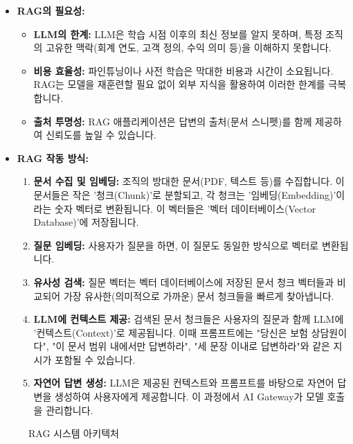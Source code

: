 \documentclass[11pt,a4paper]{article}
\theoremstyle{definition}
\begin{document}
\begin{itemize}
    \item \textbf{RAG의 필요성:}
    \begin{itemize}
        \item \textbf{LLM의 한계:} LLM은 학습 시점 이후의 최신 정보를 알지 못하며, 특정 조직의 고유한 맥락(회계 연도, 고객 정의, 수익 의미 등)을 이해하지 못합니다.
        \item \textbf{비용 효율성:} 파인튜닝이나 사전 학습은 막대한 비용과 시간이 소요됩니다. RAG는 모델을 재훈련할 필요 없이 외부 지식을 활용하여 이러한 한계를 극복합니다.
        \item \textbf{출처 투명성:} RAG 애플리케이션은 답변의 출처(문서 스니펫)를 함께 제공하여 신뢰도를 높일 수 있습니다.
    \end{itemize}

    \item \textbf{RAG 작동 방식:}
    \begin{enumerate}
        \item \textbf{문서 수집 및 임베딩:} 조직의 방대한 문서(PDF, 텍스트 등)를 수집합니다. 이 문서들은 작은 '청크(Chunk)'로 분할되고, 각 청크는 '임베딩(Embedding)'이라는 숫자 벡터로 변환됩니다. 이 벡터들은 '벡터 데이터베이스(Vector Database)'에 저장됩니다.
        \item \textbf{질문 임베딩:} 사용자가 질문을 하면, 이 질문도 동일한 방식으로 벡터로 변환됩니다.
        \item \textbf{유사성 검색:} 질문 벡터는 벡터 데이터베이스에 저장된 문서 청크 벡터들과 비교되어 가장 유사한(의미적으로 가까운) 문서 청크들을 빠르게 찾아냅니다.
        \item \textbf{LLM에 컨텍스트 제공:} 검색된 문서 청크들은 사용자의 질문과 함께 LLM에 '컨텍스트(Context)'로 제공됩니다. 이때 프롬프트에는 "당신은 보험 상담원이다", "이 문서 범위 내에서만 답변하라", "세 문장 이내로 답변하라"와 같은 지시가 포함될 수 있습니다.
        \item \textbf{자연어 답변 생성:} LLM은 제공된 컨텍스트와 프롬프트를 바탕으로 자연어 답변을 생성하여 사용자에게 제공합니다. 이 과정에서 AI Gateway가 모델 호출을 관리합니다.
    \end{enumerate}
\end{itemize}

\begin{figure}[h!]
    \centering
    \caption{RAG 시스템 아키텍처}
    \label{fig:rag_architecture}
\end{figure}
\end{document}
